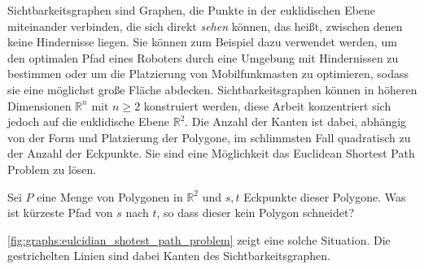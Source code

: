 Sichtbarkeitsgraphen sind Graphen, die Punkte in der euklidischen Ebene miteinander verbinden, die sich direkt \emph{sehen} können, das heißt, zwischen denen keine Hindernisse liegen.
Sie können zum Beispiel dazu verwendet werden, um den optimalen Pfad eines Roboters durch eine Umgebung mit Hindernissen zu bestimmen oder um die Platzierung von Mobilfunkmasten zu optimieren, sodass sie eine möglichst große Fläche abdecken.
Sichtbarkeitsgraphen können in höheren Dimensionen $\mathbb{R}^n$ mit $n \geq 2$ konstruiert werden, diese Arbeit konzentriert sich jedoch auf die euklidische Ebene $\mathbb{R}^2$.
Die Anzahl der Kanten ist dabei, abhängig von der Form und Platzierung der Polygone, im schlimmsten Fall quadratisch zu der Anzahl der Eckpunkte.
Sie sind eine Möglichkeit das Euclidean Shortest Path Problem zu lösen.

\begin{definition}
  Sei $P$ eine Menge von Polygonen in $\mathbb{R}^2$ und $s, t$ Eckpunkte dieser Polygone.
  Was ist kürzeste Pfad von $s$ nach $t$, so dass dieser kein Polygon schneidet?
\end{definition}

\autoref{fig:graphs:eulcidian_shotest_path_problem} zeigt eine solche Situation.
Die gestrichelten Linien sind dabei Kanten des Sichtbarkeitsgraphen.

